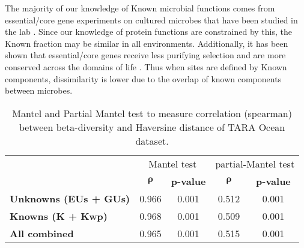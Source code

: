The majority of our knowledge of Known microbial functions comes from essential/core gene experiments on cultured microbes that have been studied in the lab \citep{Bernard_2018}. Since our knowledge of protein functions are constrained by this, the Known fraction may be similar in all environments. Additionally, it has been shown that essential/core genes receive less purifying selection and are more conserved across the domains of life \citep{Jordan_2002}. Thus when sites are defined by Known components, dissimilarity is lower due to the overlap of known components between microbes.\\

\begin{table}[]
\centering
\caption{Mantel and Partial Mantel test to measure correlation (spearman) between beta-diversity and Haversine distance of TARA Ocean dataset.}
\label{table:3.4}
\begin{tabular}{@{}lcccc@{}}
\cmidrule[\heavyrulewidth](l){2-5}
                              & \multicolumn{2}{c}{Mantel test}  & \multicolumn{2}{c}{partial-Mantel test} \\ \cmidrule(l){2-5}
                              & {$\bm{\rho}$} & \textbf{p-value} & {$\bm{\rho}$}     & \textbf{p-value}    \\ \midrule
\textbf{Unknowns (EUs + GUs)} & 0.966         & 0.001            & 0.512             & 0.001               \\
\textbf{Knowns (K + Kwp)}     & 0.968         & 0.001            & 0.509             & 0.001               \\
\textbf{All combined}         & 0.965         & 0.001            & 0.515             & 0.001               \\ \bottomrule
\end{tabular}
\end{table}




%
%

